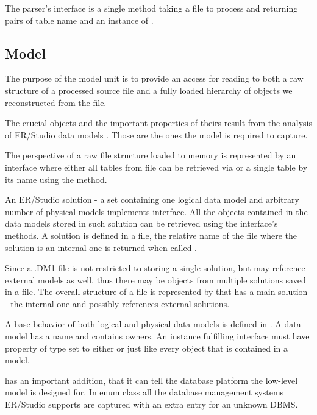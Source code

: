 
The parser's interface is a single method  taking a file to process and returning pairs of table name and an instance of .

\subsection{Model}

The purpose of the model unit is to provide an access for reading to both a raw structure of a processed source file and a fully loaded hierarchy of objects we reconstructed from the file.

The crucial objects and the important properties of theirs result from the analysis of ER/Studio data models . Those are the ones the model is required to capture.

The perspective of a raw file structure loaded to memory is represented by an interface  where either all tables from file can be retrieved via  or a single table by its name using the  method.

An ER/Studio solution - a set containing one logical data model and arbitrary number of physical models implements  interface. All the objects contained in the data models stored in such solution can be retrieved using the interface's methods. A solution is defined in a file, the relative name of the file where the solution is an internal one is returned when called . 


Since a .DM1 file is not restricted to storing a single solution, but may reference external models as well, thus there may be objects from multiple solutions saved in a file. The overall structure of a file is represented by  that has a main solution - the internal one and possibly references external solutions.

A base behavior of both logical and physical data models is defined in .
A data model has a name and contains owners. An instance fulfilling  interface must have property of type  set to either  or  just like every object that is contained in a model.

 has an important addition, that it can tell the database platform the low-level model is designed for. In enum class  all the database management systems ER/Studio supports are captured with an extra entry for an unknown DBMS.

